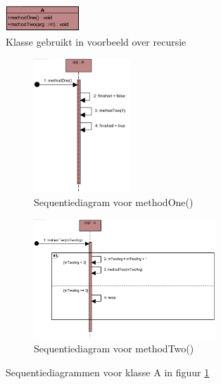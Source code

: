	\begin{figure}[h]
		\centering
		\includegraphics[width=0.25\textwidth]{chap-gedrag/recursion-class.png}
		\caption{Klasse gebruikt in voorbeeld over recursie}
		\label{fig:recursion-class}
	\end{figure}
\begin{landscape}
\thispagestyle{empty}
	\begin{figure}
		\centering
		\begin{subfigure}{\textwidth}
			\includegraphics[width=0.4\textwidth]{chap-gedrag/methodOne.png}
			\caption{Sequentiediagram voor methodOne()}
			\label{fig:methodOne}
		\end{subfigure}%
		\begin{subfigure}{\textwidth}
			\includegraphics[width=0.75\textwidth]{chap-gedrag/methodTwo.png}
			\caption{Sequentiediagram voor methodTwo()}
			\label{fig:methodtwo}
		\end{subfigure}
		\caption{Sequentiediagrammen voor klasse A in figuur \ref{fig:recursion-class}}
		\label{fig:seq-recursion}
	\end{figure}
\end{landscape}

